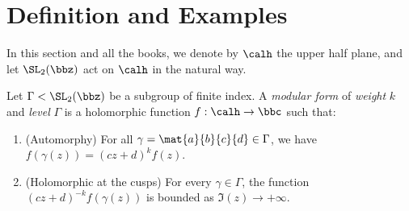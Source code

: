 \section{Definition and Examples}

    In this section and all the books, we denote by \(\calh\) the upper half plane, and let \(\SL_2(\bbz)\) act on \(\calh\) in the natural way.

    \begin{definition}\label{def: modular form}
        Let \(\Gamma < \SL_2(\bbz)\) be a subgroup of finite index. 
        A \emph{modular form} of \emph{weight} \(k\) and \emph{level} \(\Gamma\) is a holomorphic function \(f: \calh \to \bbc\) such that:
        \begin{enumerate}
            \item (Automorphy) For all \(\gamma = \mat{a}{b}{c}{d} \in \Gamma\), we have \(f(\gamma(z)) = (cz + d)^k f(z) \).
            \item (Holomorphic at the cusps) For every \(\gamma \in \Gamma\), the function \((cz + d)^{-k} f(\gamma(z))\) is bounded as \(\Im(z) \to +\infty\).
        \end{enumerate}
    \end{definition}